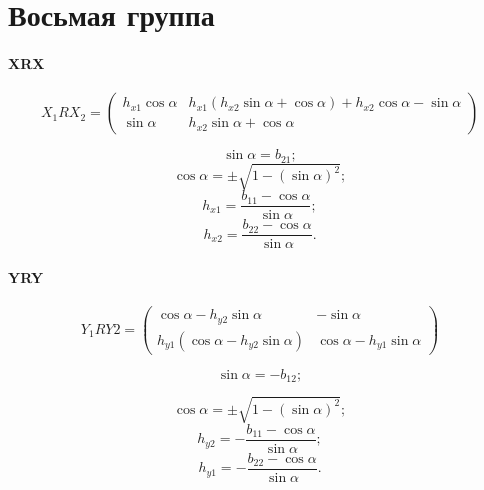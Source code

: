 \section{Восьмая группа}

\paragraph{XRX}

$$X_1RX_2 = \begin{pmatrix}
	h_{x1} \cos\alpha & h_{x1} \left( h_{x2} \sin\alpha + \cos\alpha \right) + h_{x2} \cos\alpha - \sin\alpha \\
	\sin\alpha & h_{x2} \sin\alpha + \cos\alpha
\end{pmatrix}$$

$$\sin\alpha = b_{21};$$
$$\cos\alpha = \pm \sqrt{1 - (\sin\alpha)^2};$$
$$h_{x1} = \frac{b_{11} - \cos\alpha}{\sin\alpha};$$
$$h_{x2} = \frac{b_{22} - \cos\alpha}{\sin\alpha}.$$


\paragraph{YRY}

$$Y_1RY2 = \begin{pmatrix}
	\cos\alpha - h_{y2} \sin\alpha & -\sin\alpha \\
	h_{y1} \left( \cos\alpha - h_{y2} \sin\alpha \right) & \cos\alpha - h_{y1} \sin\alpha
\end{pmatrix}$$

$$\sin\alpha = - b_{12};$$

$$\cos\alpha = \pm \sqrt{1 - (\sin\alpha)^2};$$
$$h_{y2} = -\frac{b_{11} - \cos\alpha}{\sin\alpha};$$
$$h_{y1} = -\frac{b_{22} - \cos\alpha}{\sin\alpha}.$$

